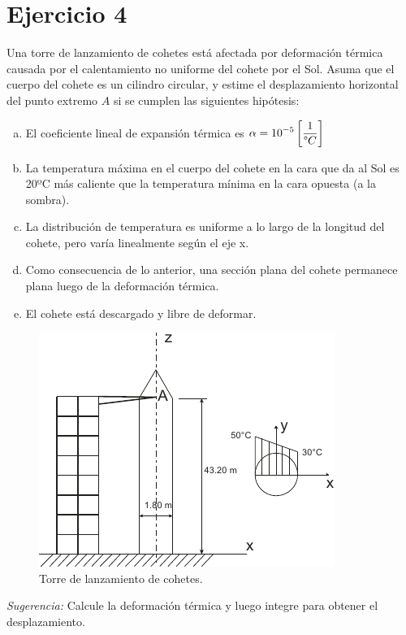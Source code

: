 \documentclass[a4paper,10pt,twoside,final,spanish]{article}
\begin{document}
\section*{Ejercicio 4}

Una torre de lanzamiento de cohetes está afectada por deformación térmica causada por el calentamiento no uniforme del cohete por el Sol. Asuma que el cuerpo del cohete es un cilindro circular, y estime el desplazamiento horizontal del punto extremo $A$ si se cumplen las siguientes hipótesis:

\begin{enumerate}[a.]
\item El coeficiente lineal de expansión térmica es 
$\displaystyle \alpha=10^{-5}
\left[
\frac{1}{\degree C}
\right]$
\item La temperatura máxima en el cuerpo del cohete en la cara que da al Sol es 20ºC más caliente que la temperatura mínima en la cara opuesta (a la sombra).
\item La distribución de temperatura es uniforme a lo largo de la longitud del cohete, 
pero varía linealmente según el eje x.
\item Como consecuencia de  lo anterior, una sección  plana del cohete  permanece 
plana luego de la deformación térmica.  
\item El cohete está descargado y libre de deformar.
\end{enumerate}

\begin{figure}[htbp]
\centerline{\includegraphics[scale=1.5]{ej4}}
\caption{Torre de lanzamiento de cohetes.}
\label{fig:ej4}
\end{figure}

\textit{Sugerencia:} Calcule la deformación térmica y luego integre para obtener el desplazamiento.\\
\end{document}
